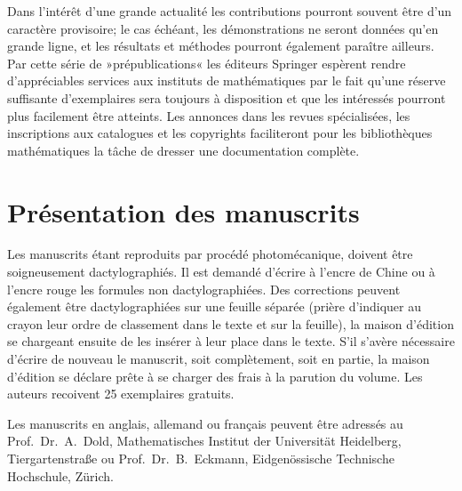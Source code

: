\medskip
Dans l'int\'er\^et d'une grande actualit\'e les contributions pourront souvent \^etre d'un caract\`ere provisoire; le cas \'ech\'eant, les d\'emonstrations ne seront donn\'ees qu'en grande ligne, et les r\'esultats et m\'ethodes pourront \'egalement para\^itre ailleurs. Par cette s\'erie de »pr\'epublications« les \'editeurs Springer esp\`erent rendre d'appr\'eciables services aux instituts de math\'ematiques par le fait qu'une r\'eserve suffisante d'exemplaires sera toujours \`a disposition et que les int\'eress\'es pourront plus facilement \^etre atteints. Les annonces dans les revues sp\'ecialis\'ees, les inscriptions aux catalogues et les copyrights faciliteront pour les biblioth\`eques math\'ematiques la t\^ache de dresser une documentation compl\`ete.

\section*{Pr\'esentation des manuscrits}
Les manuscrits \'etant reproduits par proc\'ed\'e photom\'ecanique, doivent \^etre soigneusement dactylographi\'es. Il est demand\'e d'\'ecrire \`a l'encre de Chine ou \`a l'encre rouge les formules non dactylographi\'ees. Des corrections peuvent \'egalement \^etre dactylographi\'ees sur une feuille s\'epar\'ee (pri\`ere d'indiquer au crayon leur ordre de classement dans le texte et sur la feuille), la maison d'\'edition se chargeant ensuite de les ins\'erer \`a leur place dans le texte. S'il s'av\`ere n\'ecessaire d'\'ecrire de nouveau le manuscrit, soit compl\`etement, soit en partie, la maison d'\'edition se d\'eclare pr\^ete \`a se charger des frais \`a la parution du volume. Les auteurs recoivent 25 exemplaires gratuits.

\medskip
Les manuscrits en anglais, allemand ou fran\c cais peuvent \^etre adress\'es au Prof.\ Dr.\ A.\ Dold, Mathematisches Institut der Universit\"at Heidelberg, Tiergartenstra\ss{}e ou Prof.\ Dr.\ B.\ Eckmann, Eidgen\"ossische Technische Hochschule, Z\"urich.

